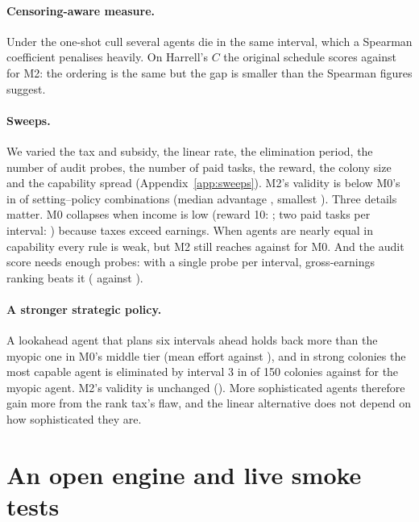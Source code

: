 \documentclass[11pt]{article}
\theoremstyle{plain}
\theoremstyle{remark}
\begin{document}
\paragraph{Censoring-aware measure.} Under the one-shot cull several agents die in the same interval, which a Spearman coefficient penalises heavily. On Harrell's $C$ the original schedule scores \CindexMZeroH{} against \CindexMTwoH{} for M2: the ordering is the same but the gap is smaller than the Spearman figures suggest.

\paragraph{Sweeps.} We varied the tax and subsidy, the linear rate, the elimination period, the number of audit probes, the number of paid tasks, the reward, the colony size and the capability spread (Appendix~\ref{app:sweeps}). M2's validity is below M0's in \SweepFlips{} of \SweepSettings{} setting--policy combinations (median advantage \SweepMedGap, smallest \SweepMinGap). Three details matter. M0 collapses when income is low (reward 10: \ValRewardTenMZero; two paid tasks per interval: \ValKTwoMZero) because taxes exceed earnings. When agents are nearly equal in capability every rule is weak, but M2 still reaches \ValClusteredMTwo{} against \ValClusteredMZero{} for M0. And the audit score needs enough probes: with a single probe per interval, gross-earnings ranking beats it (\ValProbesOneMOne{} against \ValProbesOneMTwo).

\paragraph{A stronger strategic policy.} A lookahead agent that plans six intervals ahead holds back more than the myopic one in M0's middle tier (mean effort \MidEffLook{} against \MidEffMyopic{}), and in strong colonies the most capable agent is eliminated by interval 3 in \BestDeadLook{} of 150 colonies against \BestDeadMyopic{} for the myopic agent. M2's validity is unchanged (\ValLookMTwo). More sophisticated agents therefore gain more from the rank tax's flaw, and the linear alternative does not depend on how sophisticated they are.

\section{An open engine and live smoke tests}
\label{sec:engine}
\end{document}
